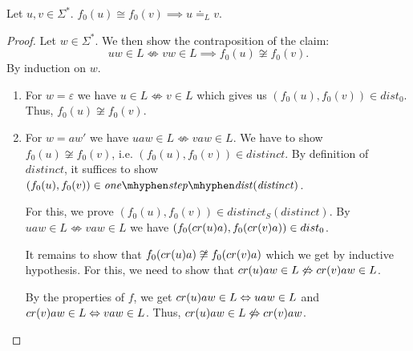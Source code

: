 \begin{lemma}
    \label{equiv_final}
    Let $u,v \in \Sigma^*$. 
    ${f_0}(u) \cong {f_0}(v) \implies u \doteq_L v$.
\end{lemma}
\begin{proof}
    Let $w \in \Sigma^*$. We then show the contraposition of the claim: 
    \begin{equation*}
        uw \in L \not\Leftrightarrow vw \in L \implies {f_0}(u) \not\cong {f_0}(v).
    \end{equation*}    
    By induction on $w$.
    \begin{enumerate}
        \item For $w = \varepsilon$ we have $u \in L \not\Leftrightarrow v \in L$ which gives us $({f_0}(u),{f_0}(v)) \in dist_0$.
            Thus, ${f_0}(u) \not\cong {f_0}(v)$.
        \item For $w = aw'$ we have $uaw \in L \not\Leftrightarrow vaw \in L$.
            We have to show ${f_0}(u) \not\cong {f_0}(v)$, i.e. $({f_0}(u), {f_0}(v)) \in \mathit{distinct}$.
            By definition of $\mathit{distinct}$, it suffices to show $({f_0}(u), {f_0}(v)) \in \mathit{one\mhyphen step\mhyphen dist}(\mathit{distinct})$.

             For this, we prove $({f_0}(u), {f_0}(v)) \in \mathit{distinct_S}(\mathit{distinct})$. 
             By $uaw \in L \not\Leftrightarrow vaw \in L$ we have $({f_0}(cr(u)a), {f_0}(cr(v)a)) \in dist_0$.

             It remains to show that ${f_0}(cr(u)a) \not\cong {f_0}(cr(v)a)$ which we get by inductive hypothesis.
             For this, we need to show that $cr(u)aw \in L \not\Leftrightarrow cr(v)aw \in L$.

             By the properties of $f$, we get $cr(u)aw \in L \Leftrightarrow uaw \in L$ and $cr(v)aw \in L \Leftrightarrow vaw \in L$.
             Thus, $cr(u)aw \in L \not\Leftrightarrow cr(v)aw$.
             
    \end{enumerate}
\end{proof}



